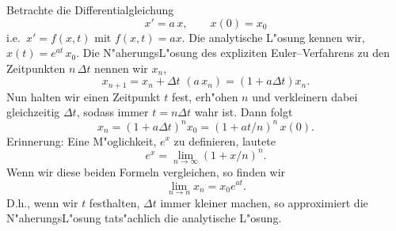 \begin{bspX}
Betrachte die Differentialgleichung 
$$ x' = a\, x,\qquad x(0)=x_0$$
i.e.\ $x' = f(x,t)$ mit $f(x,t)= a x.$
Die analytische L"osung kennen wir, $x(t)=e^{at}\, x_0$. 
Die N"aherungsL"osung des expliziten Euler--Verfahrens zu den Zeitpunkten $n\,\Delta t$ nennen wir
 $x_n$,
$$ x_{n+1} = x_n + \Delta t \,\,(a\, x_n) = (1+a\Delta t) x_n.$$
Nun halten wir einen Zeitpunkt $t$ fest, erh"ohen $n$ und verkleinern dabei
gleichzeitig $\Delta t$, sodass immer  $t=n\Delta t$  wahr ist. Dann folgt
$$ x_n =(1+a\Delta t)^n x_0 
= (1+at/n)^{n}\, x(0).$$
Erinnerung: Eine M"oglichkeit, $e^x$ zu definieren, lautete
$$ e^x = \lim_{n\rightarrow\infty} (1+x/n)^n.$$
Wenn wir diese beiden Formeln vergleichen, so finden wir
$$ \lim_{n\rightarrow n} x_n = x_0e^{at}.$$
D.h., wenn wir $t$ festhalten, $\Delta t$ immer kleiner machen, 
so approximiert
die N"aherungsL"osung tats"achlich die analytische L"osung.
\end{bspX}
